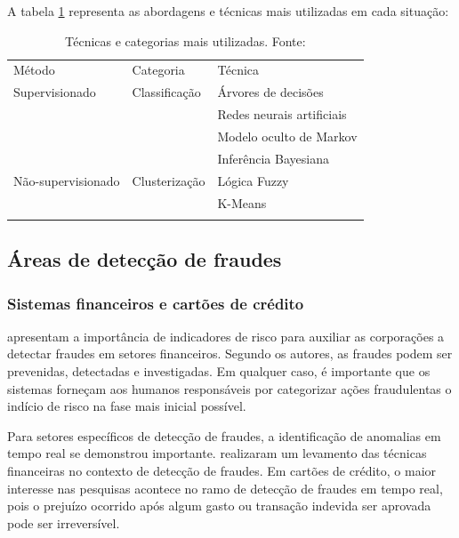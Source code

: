 \documentclass[smallextended]{svjour3}
\begin{document}
A tabela \ref{tab:tecnologias} representa as abordagens e técnicas mais utilizadas em cada situação:

\begin{table}
	\caption{Técnicas e categorias mais utilizadas. Fonte: \cite{Abdallah2016}}
	\label{tab:tecnologias}       %
	\begin{tabular}[!Ht]{lll}
		\hline\noalign{\smallskip}
		Método & Categoria & Técnica  \\
		\noalign{\smallskip}\hline\noalign{\smallskip}
		Supervisionado & Classificação & Árvores de decisões \\
		 &  & Redes neurais artificiais \\
		 &  & Modelo oculto de Markov \\
		 &  &  Inferência Bayesiana\\
		Não-supervisionado & Clusterização & Lógica Fuzzy \\
		 &  & K-Means  \\
		\noalign{\smallskip}\hline
	\end{tabular}
\end{table}

\subsection{Áreas de detecção de fraudes}
	
\subsubsection{Sistemas financeiros e cartões de crédito}

\cite{Gullkvist2013} apresentam a importância de indicadores de risco para auxiliar as corporações a detectar fraudes em setores financeiros. Segundo os autores, as fraudes podem ser prevenidas, detectadas e investigadas. Em qualquer caso, é importante que os sistemas forneçam aos humanos responsáveis por categorizar ações fraudulentas o indício de risco na fase mais inicial possível.

Para setores específicos de detecção de fraudes, a identificação de anomalias em tempo real se demonstrou importante. \cite{Edge2009} realizaram um levamento das técnicas financeiras no contexto de detecção de fraudes. Em cartões de crédito, o maior interesse nas pesquisas acontece no ramo de detecção de fraudes em tempo real, pois o prejuízo ocorrido após algum gasto ou transação indevida ser aprovada pode ser irreversível.
\end{document}
